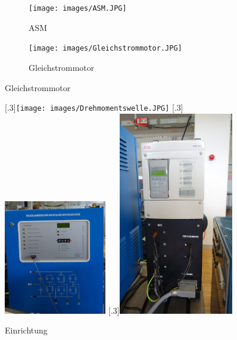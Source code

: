 \documentclass[a4paper,11pt,oneside]{book}
\begin{document}
\begin{figure}[h]
	\centering
	\begin{subfigure}[b]{0.45\textwidth}
		\texttt{[image: images/ASM.JPG]}
		\caption{ASM}
        \label{fig:einrichtung_ASM}
	\end{subfigure}
	\hfill
	\begin{subfigure}[b]{0.45\textwidth}
		\texttt{[image: images/Gleichstrommotor.JPG]}
		\caption{Gleichstrommotor}
		\label{fig:einrichtung_Gleichstrommotor}
	\end{subfigure}
\end{figure}

\begin{figure}[h]
\centering
\ContinuedFloat %
  [.3\linewidth]{\texttt{[image: images/Drehmomentswelle.JPG]}}
  \hfill
{}
  [.3\linewidth]{\includegraphics[height=5cm]{images/DreiphasigerWechselrichter_programmierbar.JPG}}
  \hfill
  [.3\linewidth]{\includegraphics[width=5cm,angle=-90]{images/Gleichrichter.JPG}}
	\caption{Einrichtung}
    \label{fig:einrichtung}
\end{figure}
\end{document}

